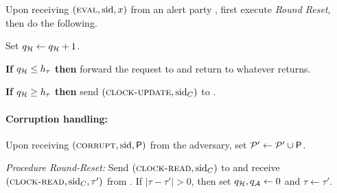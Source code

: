 \begin{cccFunctionality}
\begin{cccItemize}[nosep]
        \item Upon receiving $(\textsc{eval}, \mathrm{sid}, x)$ from an alert party \party, first execute \textit{Round Reset}, then do the following.
        \begin{cccEnum}[nosep]
            \item Set $q_\mathcal{H} \gets q_\mathcal{H} + 1$.
            \item \textbf{If} $q_\mathcal{H} \le h_\tau$ \textbf{then} forward the request to \funcGRO and return to \party whatever \funcGRO returns.
            \item \textbf{If} $q_\mathcal{H} \ge h_\tau$ \textbf{then} send $(\textsc{clock-update}, \mathrm{sid}_C)$ to \funcClock.
        \end{cccEnum}
    \end{cccItemize}

    \paragraph{Corruption handling:}
    \begin{cccItemize}[nosep]
        \item Upon receiving $(\textsc{corrupt}, \mathrm{sid}, \mathsf{P})$ from the adversary, set $\mathcal{P}' \gets \mathcal{P}' \cup \mathsf{P}$.
    \end{cccItemize}

    \medskip\emph{Procedure Round-Reset:}
    Send $(\textsc{clock-read}, \mathrm{sid}_C)$ to \funcClock and receive $(\textsc{clock-read}, \allowbreak \mathrm{sid}_C, \tau')$ from \funcClock. If $|\tau - \tau' | > 0$, then set $q_\mathcal{H}, q_\mathcal{A} \gets 0$ and $\tau \gets \tau'$.
\end{cccFunctionality}
